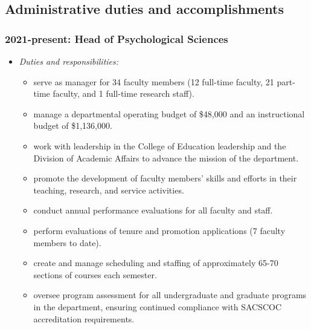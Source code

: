 \documentclass[article,10pt]{article}
\begin{document}
\subsection*{Administrative duties and accomplishments}
\label{sec:orgee42107}
\subsubsection*{2021-present: Head of Psychological Sciences}
\label{sec:org3ed1d8a}
\begin{itemize}
\item \emph{Duties and responsibilities:}
\begin{itemize}
\item serve as manager for 34 faculty members (12 full-time faculty, 21 part-time faculty, and 1 full-time research staff).
\item manage a departmental operating budget of \$48,000 and an instructional budget of \$1,136,000.
\item work with leadership in the College of Education leadership and the Division of Academic Affairs to advance the mission of the department.
\item promote the development of faculty members' skills and efforts in their teaching, research, and service activities.
\item conduct annual performance evaluations for all faculty and staff.
\item perform evaluations of tenure and promotion applications (7 faculty members to date).
\item create and manage scheduling and staffing of approximately 65-70 sections of courses each semester.
\item oversee program assessment for all undergraduate and graduate programs in the department, ensuring continued compliance with SACSCOC accreditation requirements.
\end{itemize}


\end{itemize}
\end{document}
